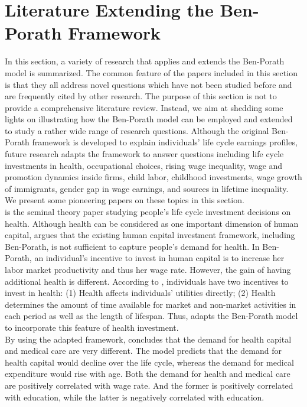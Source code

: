\section{Literature Extending the Ben-Porath Framework}

\noindent In this section, a variety of research that applies and extends the Ben-Porath model is summarized. The common feature of the papers included in this section is that they all address novel questions which have not been studied before and are frequently cited by other research. The purpose of this section is not to provide a comprehensive literature review. Instead, we aim at shedding some lights on illustrating how the Ben-Porath model can be employed and extended to study a rather wide range of research questions. Although the original Ben-Porath framework is developed to explain individuals' life cycle earnings profiles, future research adapts the framework to answer questions including life cycle investments in health, occupational choices, rising wage inequality, wage and promotion dynamics inside firms, child labor, childhood investments, wage growth of immigrants, gender gap in wage earnings, and sources in lifetime inequality. We present some pioneering papers on these topics in this section.\\
\indent \citet{grossman1972concept} is the seminal theory paper studying people's life cycle investment decisions on health. Although health can be considered as one important dimension of human capital, \citet{grossman1972concept} argues that the existing human capital investment framework, including Ben-Porath, is not sufficient to capture people's demand for health. In Ben-Porath, an individual's incentive to invest in human capital is to increase her labor market productivity and thus her wage rate. However, the gain of having additional health is different. According to \citet{grossman1972concept}, individuals have two incentives to invest in health: (1) Health affects individuals' utilities directly; (2) Health determines the amount of time available for market and non-market activities in each period as well as the length of lifespan. Thus, \citet{grossman1972concept} adapts the Ben-Porath model to incorporate this feature of health investment.\\
\indent By using the adapted framework, \citet{grossman1972concept}  concludes that the demand for health capital and medical care are very different. The model predicts that the demand for health capital would decline over the life cycle, whereas the demand for medical expenditure would rise with age. Both the demand for health and medical care are positively correlated with wage rate. And the former is positively correlated with education, while the latter is negatively correlated with education.\\
